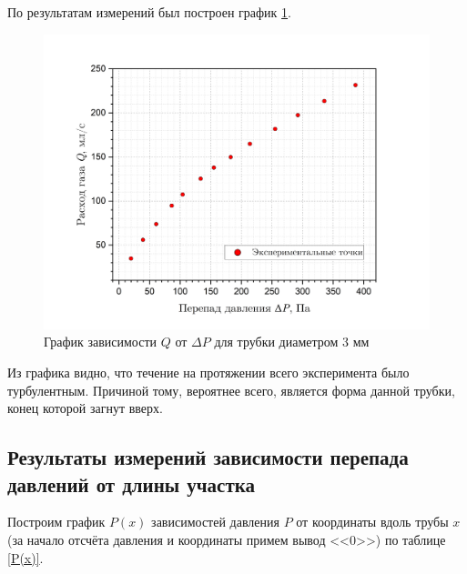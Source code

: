 \documentclass[a4paper, 12pt]{article}
\begin{document}
    \noindent По результатам измерений был построен график \ref{p(q)_3mm}.

    \begin{figure}[H]
        \centering
        \includegraphics[width = 15cm]{images/graph_3mm.png}
        \caption{График зависимости $Q$ от $\Delta P$ для трубки диаметром 3 мм}
        \label{p(q)_3mm}
    \end{figure}

    \noindent Из графика видно, что течение на протяжении всего эксперимента было турбулентным. Причиной тому, вероятнее всего, является форма данной трубки, конец которой загнут вверх.

    \subsection*{Результаты измерений зависимости перепада давлений от длины участка}

    \noindent Построим график $P(x)$ зависимостей давления $P$ от координаты вдоль трубы $x$ (за начало отсчёта давления и координаты примем вывод <<0>>) по таблице \ref{P(x)}.
\end{document}
